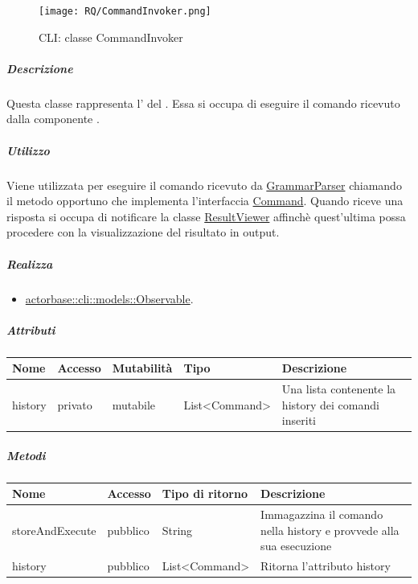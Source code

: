 \documentclass{scalatekids-article}
\begin{document}
\begin{figure}[H]
  \begin{center}
    \texttt{[image: RQ/CommandInvoker.png]}
    \caption{CLI: classe CommandInvoker}
  \end{center}
\end{figure}

\subparagraph{Descrizione}

Questa classe rappresenta l' del . Essa
si occupa di eseguire il comando ricevuto dalla componente .

\subparagraph{Utilizzo}

Viene utilizzata per eseguire il comando ricevuto da
\hyperref[sec:actorbase::cli::controllers::GrammarParser]{GrammarParser} chiamando il metodo opportuno che
implementa l'interfaccia \hyperref[sec:actorbase::cli::models::Command]{Command}.
Quando riceve una risposta si occupa di notificare la classe \hyperref[sec:actorbase::cli::views::ResultViewer]{ResultViewer}
affinchè quest'ultima possa procedere con la visualizzazione del risultato in output.

\subparagraph{Realizza}

\begin{itemize}
\item \hyperref[sec:actorbase::cli::models::Observable]{actorbase::cli::models::Observable}.
\end{itemize}

\subparagraph{Attributi}

\begin{tabular}{| p{2.5cm} | p{1.5cm} | p{2cm} | p{2.5cm} | p{8.5cm} |}
  \hline
  Nome & Accesso & Mutabilità & Tipo & Descrizione\\
  \hline
  history & privato & mutabile & List<Command> & Una lista contenente la history dei comandi inseriti\\
  \hline
\end{tabular}

\subparagraph{Metodi}

\begin{tabular}{| l | l | l | l |}
  \hline
  Nome & Accesso & Tipo di ritorno & Descrizione\\
  \hline
  storeAndExecute & pubblico & String & Immagazzina il comando nella history e provvede alla sua esecuzione\\
  \hline
  history & pubblico & List<Command> & Ritorna l'attributo history\\
  \hline
\end{tabular}
\end{document}
